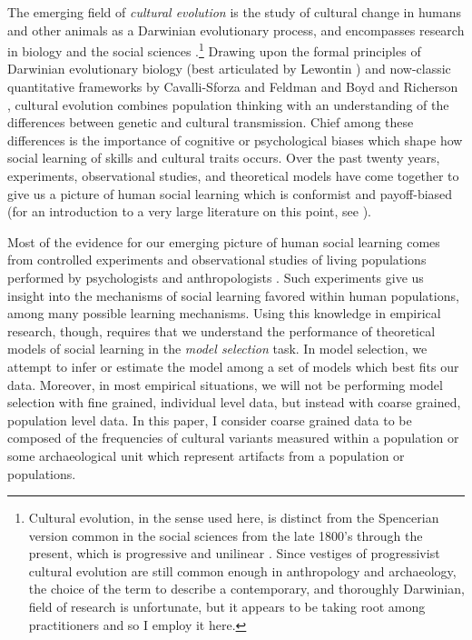 \documentclass[10pt,letterpaper]{article}
\begin{document}
The emerging field of \emph{cultural evolution} is the study of cultural change in humans and other animals as a Darwinian evolutionary process, and encompasses research in biology and the social sciences \cite{dunnell1980evolutionary,laland2011sense,8893,Mesoudi:2007,Mesoudi2015Cultural-Evolut,o2000applying}.\footnote{Cultural evolution, in the sense used here, is distinct from the Spencerian version common in the social sciences from the late 1800's through the present, which is progressive and unilinear \cite{morgan1877ancient,tylor1874primitive,white1949science}.  Since vestiges of progressivist cultural evolution are still common enough in anthropology and archaeology, the choice of the term to describe a contemporary, and thoroughly Darwinian, field of research is unfortunate, but it appears to be taking root among practitioners and so I employ it here.}  Drawing upon the formal principles of Darwinian evolutionary biology (best articulated by Lewontin \cite{Lewontin1970}) and now-classic quantitative frameworks by Cavalli-Sforza and Feldman \cite{CF1981} and Boyd and Richerson \cite{BR1985}, cultural evolution combines population thinking with an understanding of the differences between genetic and cultural transmission.  Chief among these differences is the importance of cognitive or psychological biases which shape how social learning of skills and cultural traits occurs.  Over the past twenty years, experiments, observational studies, and theoretical models have come together to give us a picture of human social learning which is conformist and payoff-biased (for an introduction to a very large literature on this point, see \cite{boyd2005origin,Henrich:2001p5229,8897,laland2004social,8895,Mesoudi2015Cultural-Evolut}).  

Most of the evidence for our emerging picture of human social learning comes from controlled experiments and observational studies of living populations performed by psychologists and anthropologists \cite{henrich2011fiji}.  Such experiments give us insight into the mechanisms of social learning favored within human populations, among many possible learning mechanisms.  Using this knowledge in empirical research, though, requires that we understand the performance of theoretical models of social learning in the \emph{model selection} task.  In model selection, we attempt to infer or estimate the model among a set of models which best fits our data.  Moreover, in most empirical situations, we will not be performing model selection with fine grained, individual level data, but instead with coarse grained, population level data.  In this paper, I consider coarse grained data to be composed of the frequencies of cultural variants measured within a population or some archaeological unit which represent artifacts from a population or populations.  
\end{document}
